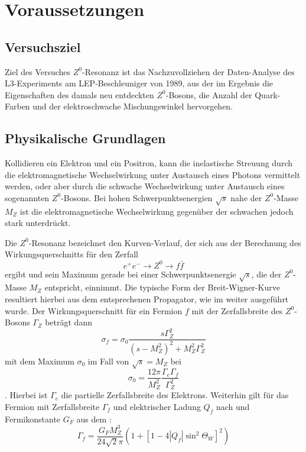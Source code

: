 \section{Voraussetzungen}

\subsection{Versuchsziel}

Ziel des Versuches $Z^0$-Resonanz ist das Nachzuvollziehen der Daten-Analyse des
L3-Experiments am LEP-Beschleuniger von 1989, aus der im Ergebnis die
Eigenschaften des damals neu entdeckten $Z^0$-Bosons, die Anzahl der
Quark-Farben und der elektroschwache Mischungswinkel hervorgehen.

\subsection{Physikalische Grundlagen}

Kollidieren ein Elektron und ein Positron, kann die inelastische Streuung durch
die elektromagnetische Wechselwirkung unter Austausch eines Photons vermittelt
werden, oder aber durch die schwache Wechselwirkung unter Austausch eines
sogenannten $Z^0$-Bosons. Bei hohen Schwerpunktsenergien $\sqrt{s}$ nahe der
$Z^0$-Masse $M_Z$ ist die elektromagnetische Wechselwirkung gegenüber der
schwachen jedoch stark unterdrückt.

Die $Z^0$-Resonanz bezeichnet den Kurven-Verlauf, der sich aus der
Berechnung des Wirkungsquerschnitts für den Zerfall
\begin{equation}
  e^{+} e^{-} \rightarrow Z^0 \rightarrow f \bar{f}
\end{equation}
ergibt und sein Maximum gerade bei einer Schwerpunktsenergie
$\sqrt{s}$, die der $Z^0$-Masse $M_Z$ entspricht, einnimmt. Die typische Form
der Breit-Wigner-Kurve resultiert hierbei aus dem entsprechenen Propagator,
wie im \cite[Gl. 2]{script} weiter ausgeführt wurde. Der Wirkungsquerschnitt für
ein Fermion $f$ mit der Zerfallsbreite des $Z^0$-Bosons $\Gamma_Z$ beträgt dann
\begin{equation}
  \label{eqn:sigmaf}
  \sigma_f = \sigma_0 \frac{s \Gamma_Z^2}{(s - M_Z^2)^2 + M_Z^2\Gamma_Z^2}
\end{equation}
mit dem Maximum $\sigma_0$ im Fall von $\sqrt{s} = M_Z$ bei
\begin{equation}
  \sigma_0 = \frac{12\pi}{M_Z^2}\frac{\Gamma_e\Gamma_f}{\Gamma_Z^2}
\end{equation}
. Hierbei ist $\Gamma_e$ die partielle Zerfallsbreite des Elektrons. Weiterhin gilt
für das Fermion mit Zerfallsbreite $\Gamma_f$ und elektrischer Ladung $Q_f$ nach
\cite[Gl. 6]{script} und Fermikonstante $G_F$ aus dem \cite{pdb}:
\begin{equation}
  \Gamma_f = \frac{G_F M_Z^3}{24 \sqrt{2}\pi}\left(1+[1-4|Q_f|\sin^2\Theta_W]^2\right)
\end{equation}

